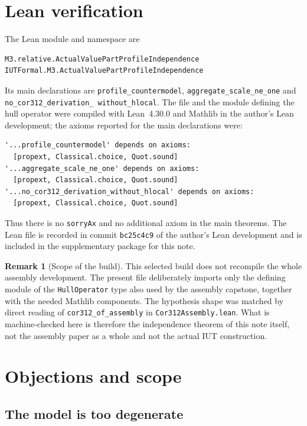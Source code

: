 \documentclass[11pt]{article}
\theoremstyle{definition}
\newtheorem{remark}[theorem]{Remark}
\begin{document}
\section{Lean verification}

The Lean module and namespace are
\begin{verbatim}
M3.relative.ActualValuePartProfileIndependence
IUTFormal.M3.ActualValuePartProfileIndependence
\end{verbatim}
Its
main declarations are
{\small\texttt{profile\_countermodel}},
{\small\texttt{aggregate\_scale\_ne\_one}} and
{\small\texttt{no\_cor312\_derivation\_\allowbreak
without\_hlocal}}.
The file and the module defining the hull operator were compiled
with Lean~4.30.0 and Mathlib in the author's Lean development; the
axioms reported for the main declarations were:
\begin{verbatim}
'...profile_countermodel' depends on axioms:
  [propext, Classical.choice, Quot.sound]
'...aggregate_scale_ne_one' depends on axioms:
  [propext, Classical.choice, Quot.sound]
'...no_cor312_derivation_without_hlocal' depends on axioms:
  [propext, Classical.choice, Quot.sound]
\end{verbatim}
Thus there is no \texttt{sorryAx} and no additional axiom in the
main theorems.  The Lean file is recorded in commit
\texttt{bc25c4c9} of the author's Lean development and is included
in the supplementary package for this note.

\begin{remark}[Scope of the build]
This selected build does not recompile the whole assembly
development.  The present file deliberately imports only the
defining module of the \texttt{HullOperator} type also used by
the assembly capstone, together with the needed Mathlib
components.  The hypothesis shape was matched by direct reading
of \texttt{cor312\_of\_assembly} in
\texttt{Cor312Assembly.lean}.  What is machine-checked here is
therefore the independence theorem of this note itself, not the
assembly paper as a whole and not the actual IUT construction.
\end{remark}

\section{Objections and scope}

\subsection{The model is too degenerate}
\end{document}
